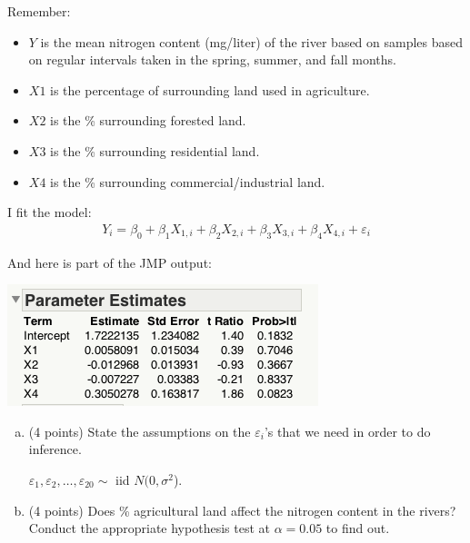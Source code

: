 \documentclass{article}\usepackage{graphicx, color}
\providecommand{\e}{\varepsilon}
\numberwithin{equation}{section}
\begin{document}
\begin{flushleft}
\begin{enumerate}[1. ]
\begin{center}
\end{center}

Remember:
\begin{itemize}
\item $Y$ is the mean nitrogen content (mg/liter) of the river based on samples based on regular intervals taken in the spring, summer, and fall months.
\item $X1$ is the percentage of surrounding land used in agriculture.
\item $X2$ is the \% surrounding forested land.
\item $X3$ is the \% surrounding residential land.
\item $X4$ is the \% surrounding commercial/industrial land.
\end{itemize}

I fit the model:
\begin{align*}
Y_i = \beta_0 + \beta_1 X_{1, i}  + \beta_2 X_{2, i}  + \beta_3 X_{3, i}  + \beta_4 X_{4, i} + \e_i 
\end{align*}

And here is part of the JMP output:

\begin{center}
 \includegraphics{../../fig/riversparams.png}
\end{center}

\begin{enumerate}[a. ]
\item (4 points) State the assumptions on the $\e_i$'s that we need in order to do inference.

{\color{red} $\e_1, \e_2, \ldots, \e_{20} \sim $ iid $N(0, \sigma^2$). }


\item (4 points) Does \% agricultural land affect the nitrogen content in the rivers? Conduct the appropriate hypothesis test at $\alpha = 0.05$ to find out.

{\color{red}

}
\end{enumerate}
\end{enumerate}
\end{flushleft}
\end{document}
